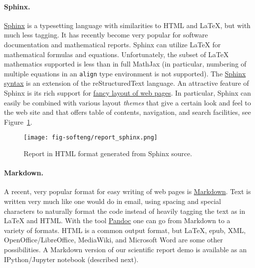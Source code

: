\documentclass[graybox,sectrefs,envcountresetchap,open=right,final]{svmonodo}
\begin{document}

\paragraph{Sphinx.}

\href{{http://sphinx.pocoo.org/}}{Sphinx} is a typesetting language with
similarities to HTML and {\LaTeX}, but with much less tagging. It has
recently become very popular for software documentation and
mathematical reports. Sphinx can utilize {\LaTeX} for mathematical
formulas and equations. Unfortunately, the
subset of {\LaTeX} mathematics supported is less than in full MathJax (in
particular, numbering of multiple equations in an \texttt{align} type
environment is not supported).  The \href{{http://tinyurl.com/nc4upel/_static/report_sphinx.rst.html}}{Sphinx syntax} is an extension of
the reStructuredText language. An attractive feature of Sphinx is its
rich support for \href{{http://tinyurl.com/nc4upel/_static/sphinx-cloud/index.html}}{fancy layout of web pages}. In particular,
Sphinx can easily be combined with various layout \emph{themes} that give a
certain look and feel to the web site and that offers table of
contents, navigation, and search facilities, see Figure~\ref{softeng1:exper:report:fig:sphinx}.


\begin{figure}[!ht]  %
  \centerline{\texttt{[image: fig-softeng/report\_sphinx.png]}}
  \caption{
  Report in HTML format generated from Sphinx source. \label{softeng1:exper:report:fig:sphinx}
  }
\end{figure}



\paragraph{Markdown.}
A recent, very popular format for easy writing of web pages is
\href{{http://daringfireball.net/projects/markdown/}}{Markdown}.
Text is written very much like one would do in email, using
spacing and special characters to naturally format the code
instead of heavily tagging the text as in {\LaTeX} and HTML.
With the tool \href{{http://johnmacfarlane.net/pandoc/}}{Pandoc} one
can go from Markdown to a variety of formats.
HTML is a common output format, but {\LaTeX}, epub, XML,
OpenOffice/LibreOffice, MediaWiki, and Microsoft Word are some other
possibilities. A Markdown version of our scientific
report demo is available as an IPython/Jupyter notebook (described next).
\end{document}

